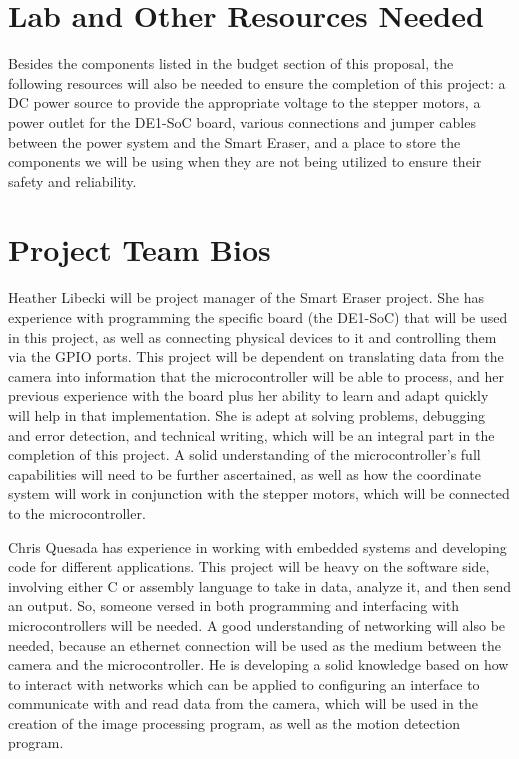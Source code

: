 \documentclass[10pt,onecolumn,draftclsnofoot]{IEEEtran} 					%
\begin{document}
	\section{Lab and Other Resources Needed}
	\setlength{\parindent}{5ex}	
	Besides the components listed in the budget section of this proposal, the following resources will also be needed to ensure the completion of this project: a DC power source to provide the appropriate voltage to the stepper motors, a power outlet for the DE1-SoC board, various connections and jumper cables between the power system and the Smart Eraser, and a place to store the components we will be using when they are not being utilized to ensure their safety and reliability.
	\section{Project Team Bios}
	\setlength{\parindent}{5ex}
	Heather Libecki will be project manager of the Smart Eraser project. She has experience with programming the specific board (the DE1-SoC) that will be used in this project, as well as connecting physical devices to it and controlling them via the GPIO ports. This project will be dependent on translating data from the camera into information that the microcontroller will be able to process, and her previous experience with the board plus her ability to learn and adapt quickly will help in that implementation. She is adept at solving problems, debugging and error detection, and technical writing, which will be an integral part in the completion of this project. A solid understanding of the microcontroller{\rq}s full capabilities will need to be further ascertained, as well as how the coordinate system will work in conjunction with the stepper motors, which will be connected to the microcontroller.\par
	\setlength{\parindent}{5ex}	
	Chris Quesada has experience in working with embedded systems and developing code for different applications. This project will be heavy on the software side, involving either C or assembly language to take in data, analyze it, and then send an output. So, someone versed in both programming and interfacing with microcontrollers will be needed. A good understanding of networking will also be needed, because an ethernet connection will be used as the medium between the camera and the microcontroller. He is developing a solid knowledge based on how to interact with networks which can be applied to configuring an interface to communicate with and read data from the camera, which will be used in the creation of the image processing program, as well as the motion detection program.\par
\end{document}
